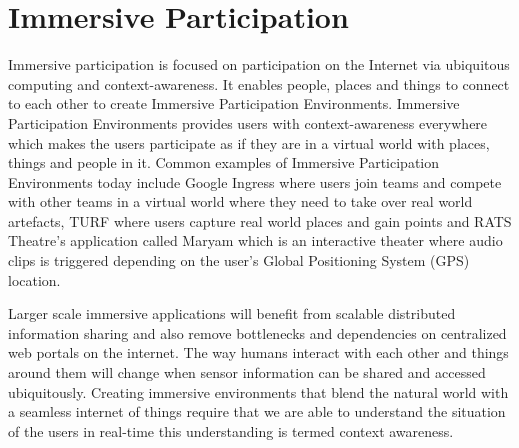 \section{Immersive Participation}
Immersive participation is focused on participation on the Internet via ubiquitous computing and context-awareness. It enables people, places and things to connect to each other to create Immersive Participation Environments. Immersive Participation Environments provides users with context-awareness everywhere which makes the users participate as if they are in a virtual world with places, things and people in it. Common examples of Immersive Participation Environments today include Google Ingress \cite{ingress} where users join teams and compete with other teams in a virtual world where they need to take over real world artefacts, TURF \cite{turf} where users capture real world places and gain points and RATS Theatre's \cite{rats} application called Maryam \cite{maryam} which is an interactive theater where audio clips is triggered depending on the user's Global Positioning System (GPS) location.

Larger scale immersive applications will benefit from scalable distributed information sharing and also remove bottlenecks and dependencies on centralized web portals on the internet.
The way humans interact with each other and things around them will change when sensor information can be shared and accessed ubiquitously. Creating immersive environments that blend the natural world with a seamless internet of things require that we are able to understand the situation of the users in real-time this understanding is termed context awareness.
